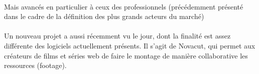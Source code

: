 
\paragraph {}

Mais %
avancés en particulier à ceux des professionnels (précédemment
présenté dans le cadre de la définition des plus grands acteurs du
marché) %

\paragraph{}

Un nouveau projet a aussi récemment vu le jour, dont la finalité est
assez différente des logiciels actuellement présents. Il s'agit de
Novacut, qui permet aux créateurs de films et séries web de faire le
montage de manière collaborative %
les ressources (footage).

\paragraph{}






